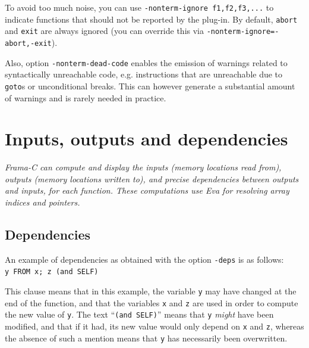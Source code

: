 \documentclass[web]{frama-c-book}
\newcommand{\Eva}{\textsf{Eva}}
\begin{document}
To avoid too much noise, you can use \verb|-nonterm-ignore f1,f2,f3,...|
to indicate functions that should not be reported by the plug-in. By default,
\verb|abort| and \verb|exit| are always ignored (you can override this via
\verb|-nonterm-ignore=-abort,-exit|).

Also, option \verb|-nonterm-dead-code| enables the emission of warnings related
to syntactically unreachable code, e.g. instructions that are unreachable due to
\verb|goto|s or unconditional breaks. This can however generate a substantial
amount of warnings and is rarely needed in practice.


\chapter{Inputs, outputs and dependencies}\label{inoutdeps}
\vspace{2cm}

{\em Frama-C can compute and display the inputs (memory locations read from), 
outputs (memory locations written to), 
and precise dependencies between outputs and inputs,
for each function. These computations use \Eva{}
for resolving array indices and pointers.}

\vspace{2cm}


\section{Dependencies}
\label{sec:dependencies}
An example of dependencies as obtained with the option \lstinline|-deps| is
as follows:\\
\lstinline|y FROM x; z (and SELF)|

This clause means that in this example, the variable \lstinline|y| may have
changed at the end of the function, and that the variables \lstinline|x| and
\lstinline|z| are used in order to compute the new value of \lstinline|y|.
The text ``\lstinline|(and SELF)|'' means that \lstinline|y| {\em might}
have been modified, and that if it had, its new value would only depend
on \lstinline|x| and \lstinline|z|,  whereas the absence of such a mention
means that \lstinline|y| has necessarily been overwritten.
\end{document}
